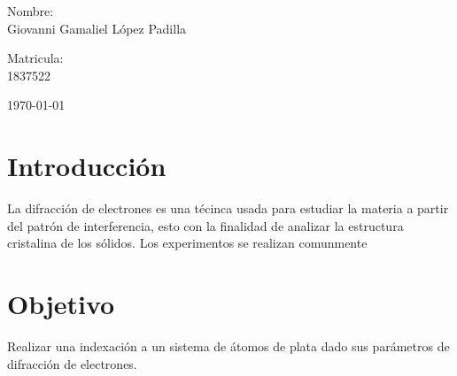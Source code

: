\documentclass[reprint,amsmath,amssymb,aps,]{revtex4-2}
\begin{document}
\begin{titlepage}
\begin{center}
\begin{minipage}{0.6\linewidth}
\vspace{0.5cm}
\changefontsizes{14pt}
Nombre:\\
Giovanni Gamaliel López Padilla\\
\end{minipage}
\begin{minipage}{0.2\linewidth}
\changefontsizes{14pt}
Matricula:\\
1837522\\
\end{minipage}
\end{center}
\vspace{4cm}
\begin{flushright}
\today
\end{flushright}
\pagebreak
\end{titlepage}
\maketitle
\section{Introducción}
La difracción de electrones es una t\'ecinca usada para estudiar la 
materia a partir del patr\'on  de interferencia, esto con la finalidad de 
analizar la estructura cristalina de los s\'olidos. Los experimentos se realizan comunmente 

\section{Objetivo}
Realizar una indexación a un sistema de átomos de plata dado sus parámetros de difracción de electrones.
\end{document}
